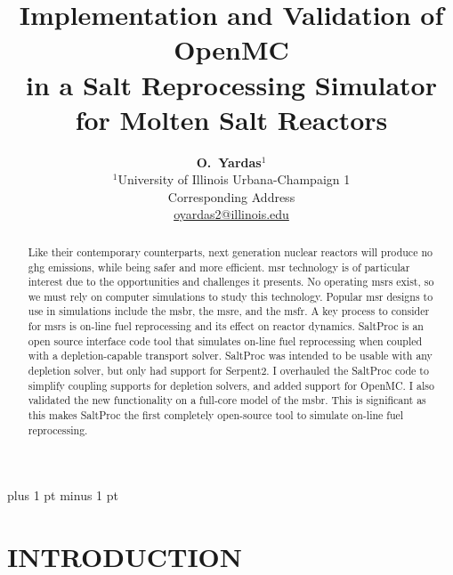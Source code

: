 \documentclass[letterpaper]{mc2023}
\title{Implementation and Validation of OpenMC \\
in a Salt Reprocessing Simulator for Molten Salt Reactors}
\author{%
  \textbf{O.~Yardas$^1$}\vspace{3pt} \\
  $^1$University of Illinois Urbana-Champaign 1  \\
  Corresponding Address \vspace{6pt}\\ 
  \url{oyardas2@illinois.edu}
}
\begin{document}

\maketitle
\justify 
\parskip 6pt plus 1 pt minus 1 pt

\begin{abstract}
  Like their contemporary counterparts, next generation nuclear
  reactors will produce no \Gls{ghg} emissions, while being safer and more
  efficient. \Gls{msr} technology is of particular interest due to the
  opportunities and challenges it presents. No operating \Gls{msr}s exist, so we
  must rely on computer simulations to study this technology. Popular \Gls{msr}
  designs to use in simulations include the \Gls{msbr}, the \Gls{msre}, and the
  \Gls{msfr}. A key process to consider for \Gls{msr}s is on-line fuel
  reprocessing and its effect on reactor dynamics. SaltProc is an open source
  interface code tool that simulates on-line fuel reprocessing when coupled with
  a depletion-capable transport solver. SaltProc was intended to be usable with
  any depletion solver, but only had support for Serpent2. I overhauled the
  SaltProc code to simplify coupling supports for depletion solvers, and added
  support for OpenMC. I also validated the new functionality on a full-core model
  of the \Gls{msbr}. This is significant as this makes SaltProc the first
  completely open-source tool to simulate on-line fuel reprocessing.
\end{abstract}
\vspace{6pt}

\section{INTRODUCTION} 
\end{document}
